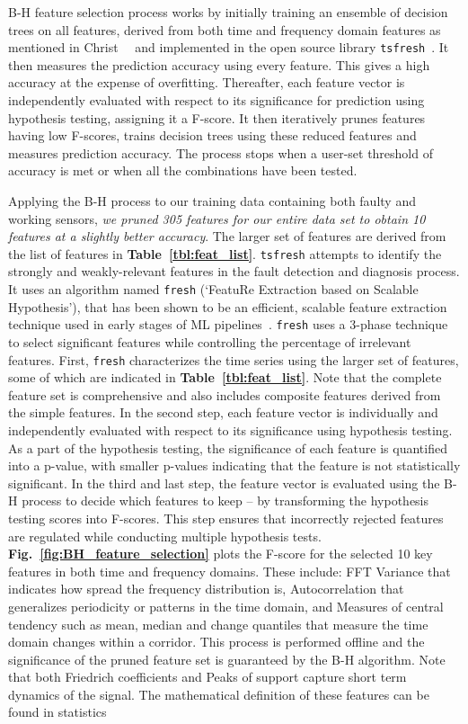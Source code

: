 B-H feature selection process works by initially training an ensemble of decision trees on all features, derived from both time and frequency domain features as mentioned in Christ~\etal~\cite{christ2018time} and implemented in the open source library \texttt{tsfresh}~\cite{tsfresh2018code}. It then measures the prediction accuracy using every feature. This gives a high accuracy at the expense of overfitting. Thereafter, each feature vector is independently evaluated with respect to its significance for prediction using hypothesis testing, assigning it a F-score. It then iteratively prunes features having low F-scores, trains decision trees using these reduced features and measures prediction accuracy. The process stops when a user-set threshold of accuracy is met or when all the combinations have been tested. 

Applying the B-H process to our training data containing both faulty and working sensors, \emph{we pruned 305 features for our entire data set to obtain 10 features at a slightly better accuracy}. The larger set of features are derived from the list of features in {\bfseries Table~\ref{tbl:feat_list}}. \texttt{tsfresh} attempts to identify the strongly and weakly-relevant features in the fault detection and diagnosis process. It uses an algorithm named \texttt{fresh} (`FeatuRe Extraction based on Scalable Hypothesis'), that has been shown to be an efficient, scalable feature extraction technique used in early stages of ML pipelines~\cite{christ2016distributed, christ2018time}. \texttt{fresh} uses a 3-phase technique to select significant features while controlling the percentage of irrelevant features. First, \texttt{fresh} characterizes the time series using the larger set of features, some of which are indicated in {\bfseries Table~\ref{tbl:feat_list}}. Note that the complete feature set is comprehensive and also includes composite features derived from the simple features. In the second step, each feature vector is individually and independently evaluated with respect to its significance using hypothesis testing. As a part of the hypothesis testing, the significance of each feature is quantified into a p-value, with smaller p-values indicating that the feature is not statistically significant. In the third and last step, the feature vector is evaluated using the B-H process to decide which features to keep -- by transforming the hypothesis testing scores into F-scores. This step ensures that incorrectly rejected features are regulated while conducting multiple hypothesis tests. {\bfseries Fig.~\ref{fig:BH_feature_selection}} plots the F-score for the selected 10 key features in both time and frequency domains. These include: \ca FFT Variance that indicates how spread the frequency distribution is, \cb Autocorrelation that generalizes periodicity or patterns in the time domain, and \cc  Measures of central tendency such as mean, median and change quantiles that measure the time domain changes within a corridor. This process is performed offline and the significance of the pruned feature set is guaranteed by the B-H algorithm. Note that both Friedrich coefficients and Peaks of support capture short term dynamics of the signal. The mathematical definition of these features can be found in statistics 
